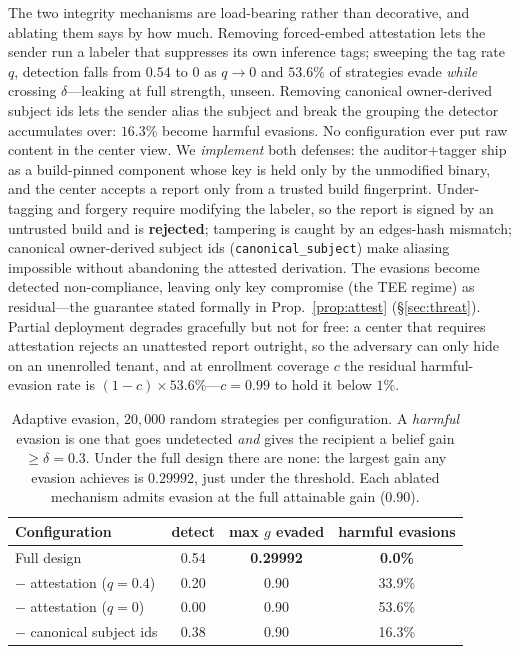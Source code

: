\documentclass{article}
\begin{document}
The two integrity mechanisms are load-bearing rather than decorative, and
ablating them says by how much. Removing forced-embed attestation lets the sender
run a labeler that suppresses its own inference tags; sweeping the tag rate $q$,
detection falls from $0.54$ to $0$ as $q\to0$ and $53.6\%$ of strategies evade
\emph{while} crossing $\delta$---leaking at full strength, unseen. Removing
canonical owner-derived subject ids lets the sender alias the subject and break
the grouping the detector accumulates over: $16.3\%$ become harmful evasions. No
configuration ever put raw content in the center view. We \emph{implement} both
defenses:
the auditor+tagger ship as a build-pinned component whose key is held only by the
unmodified binary, and the center accepts a report only from a trusted build
fingerprint. Under-tagging and forgery require modifying the labeler, so the
report is signed by an untrusted build and is \textbf{rejected}; tampering is
caught by an edges-hash mismatch; canonical owner-derived subject ids
(\texttt{canonical\_subject}) make aliasing impossible without abandoning the
attested derivation. The evasions become detected non-compliance, leaving only
key compromise (the TEE regime) as residual---the guarantee stated formally in
Prop.~\ref{prop:attest} (\S\ref{sec:threat}). Partial deployment degrades
gracefully but not for free: a center that requires attestation rejects an
unattested report outright, so the adversary can only hide on an unenrolled
tenant, and at enrollment coverage $c$ the residual harmful-evasion rate is
$(1-c)\times53.6\%$---$c{=}0.99$ to hold it below $1\%$.

\begin{table}[t]\centering\small
\begin{tabular}{lccc}
\toprule
Configuration & detect & max $g$ evaded & harmful evasions \\
\midrule
Full design & 0.54 & \textbf{0.29992} & \textbf{0.0\%} \\
$-$ attestation ($q{=}0.4$) & 0.20 & 0.90 & 33.9\% \\
$-$ attestation ($q{=}0$) & 0.00 & 0.90 & 53.6\% \\
$-$ canonical subject ids & 0.38 & 0.90 & 16.3\% \\
\bottomrule
\end{tabular}
\caption{Adaptive evasion, $20{,}000$ random strategies per configuration. A
\emph{harmful} evasion is one that goes undetected \emph{and} gives the recipient
a belief gain $\geq\delta{=}0.3$. Under the full design there are none: the
largest gain any evasion achieves is $0.29992$, just under the threshold. Each
ablated mechanism admits evasion at the full attainable gain ($0.90$).}
\label{tab:evasion}
\end{table}
\end{document}

